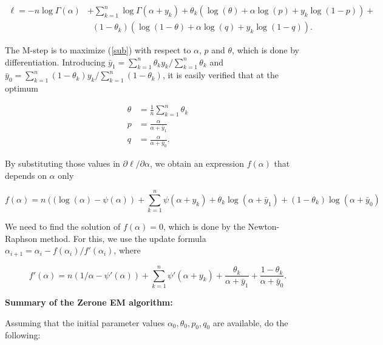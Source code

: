 \documentclass[12pt]{article}
\begin{document}
    \begin{align}
    \ell = -n \log \Gamma(\alpha) &+ \sum_{k=1}^n
      \log \Gamma(\alpha + y_k) + \nonumber
    \theta_k (\log(\theta) + \alpha \log(p) +
    y_k \log(1-p)) + \nonumber \\
    &\;\; (1-\theta_k) (\log(1-\theta) + \alpha \log(q) +
    y_k \log(1-q)).
\label{sub}
    \end{align}

    The M-step is to maximize (\ref{sub}) with respect to
    $\alpha$, $p$ and $\theta$, which is done by
    differentiation. Introducing
    $\bar{y}_1 = \sum_{k=1}^n \theta_k y_k / \sum_{k=1}^n \theta_k$
    and $\bar{y}_0 = \sum_{k=1}^n (1-\theta_k) y_k /
    \sum_{k=1}^n (1-\theta_k)$, it is easily verified that at
    the optimum

    \begin{align*}
    \theta &= \frac{1}{n}\sum_{k=1}^n\theta_k \\
    p &= \frac{\alpha} {\alpha+\bar{y}_1} \\
    q &= \frac{\alpha} {\alpha+\bar{y}_0}.
    \end{align*}

    By substituting those values in $\partial \ell / \partial \alpha$,
    we obtain an expression $f(\alpha)$ that depends on $\alpha$ only

    \begin{equation*}
       f(\alpha) = n \left( (\log(\alpha) - \psi(\alpha) \right) +
      \sum_{k=1}^n \psi(\alpha+y_k) + \theta_k \log(\alpha + \bar{y}_1)
      + (1-\theta_k) \log(\alpha + \bar{y}_0)
    \end{equation*}

    We need to find the solution of $f(\alpha) = 0$, which is done by
    the Newton-Raphson method. For this, we use the update formula
    $\alpha_{i+1} = \alpha_i - f(\alpha_i)/f'(\alpha_i)$, where

    \begin{equation*}
      f'(\alpha) = n \left( 1/\alpha - \psi'(\alpha) \right) +
      \sum_{k=1}^n \psi'(\alpha+y_k) +
      \frac{\theta_k}{\alpha+\bar{y}_1} +
      \frac{1-\theta_k}{\alpha + \bar{y}_0}.
    \end{equation*}

\noindent
    \textbf{Summary of the Zerone EM algorithm:} \par
    Assuming that the initial parameter values
    $\alpha_0, \theta_0, p_0, q_0$ are available, do the following:
\end{document}
